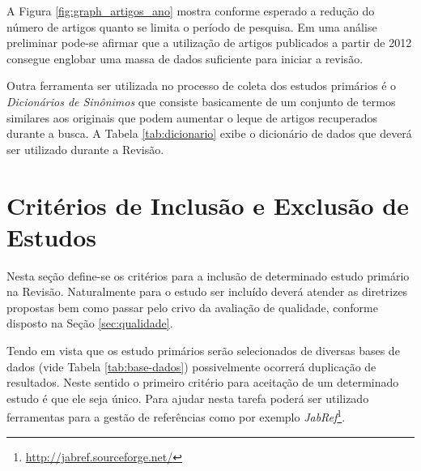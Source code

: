 \documentclass{article}
\begin{document}
A Figura \ref{fig:graph_artigos_ano} mostra conforme esperado a
redução do número de artigos quanto se limita o período de
pesquisa. Em uma análise preliminar pode-se afirmar que a utilização
de artigos publicados a partir de 2012 consegue englobar uma massa de
dados suficiente para iniciar a revisão.

Outra ferramenta ser utilizada no processo de coleta dos estudos primários é o
\textit{Dicionários de Sinônimos} que consiste basicamente de um conjunto de
termos similares aos originais que podem aumentar o leque de artigos
recuperados durante a busca. A Tabela \ref{tab:dicionario} exibe o dicionário de dados que deverá ser utilizado durante a Revisão.

\begin{table}[ht]
\centering
{}
\caption{Dicionário de Sinônimos}
\label{tab:dicionario}
\end{table}


\section{Critérios de Inclusão e Exclusão de Estudos}
\label{sec:criterios_in_out}

Nesta seção define-se os critérios para a inclusão de determinado estudo
primário na Revisão. Naturalmente para o estudo ser incluído deverá atender as diretrizes propostas bem
como passar pelo crivo da avaliação de qualidade, conforme disposto na Seção
\ref{sec:qualidade}.

Tendo em vista que os estudo primários serão selecionados de diversas bases de
dados (vide Tabela \ref{tab:base-dados}) possivelmente ocorrerá duplicação de
resultados. Neste sentido o primeiro critério para aceitação de um determinado
estudo é que ele seja único. Para ajudar nesta tarefa poderá ser utilizado
ferramentas para a gestão de referências como por exemplo
\textit{JabRef}\footnote{\url{http://jabref.sourceforge.net/}}.
\end{document}
